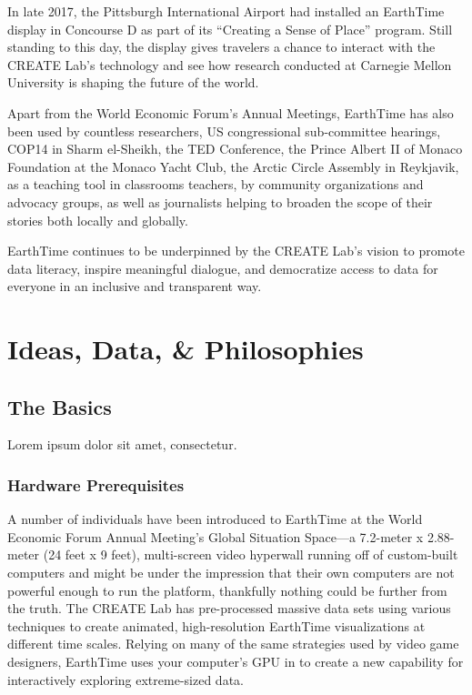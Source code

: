 \documentclass[
]{book}
\begin{document}
In late 2017, the Pittsburgh International Airport had installed an EarthTime display in Concourse D as part of its ``Creating a Sense of Place'' program. Still standing to this day, the display gives travelers a chance to interact with the CREATE Lab's technology and see how research conducted at Carnegie Mellon University is shaping the future of the world.

Apart from the World Economic Forum's Annual Meetings, EarthTime has also been used by countless researchers, US congressional sub-committee hearings, COP14 in Sharm el-Sheikh, the TED Conference, the Prince Albert II of Monaco Foundation at the Monaco Yacht Club, the Arctic Circle Assembly in Reykjavik, as a teaching tool in classrooms teachers, by community organizations and advocacy groups, as well as journalists helping to broaden the scope of their stories both locally and globally.

EarthTime continues to be underpinned by the CREATE Lab's vision to promote data literacy, inspire meaningful dialogue, and democratize access to data for everyone in an inclusive and transparent way.

\hypertarget{part-ideas-data-philosophies}{%
\part{Ideas, Data, \& Philosophies}\label{part-ideas-data-philosophies}}

\hypertarget{the-basics}{%
\chapter{The Basics}\label{the-basics}}

Lorem ipsum dolor sit amet, consectetur.

\hypertarget{hardware-prerequisites}{%
\section{Hardware Prerequisites}\label{hardware-prerequisites}}

A number of individuals have been introduced to EarthTime at the World Economic Forum Annual Meeting's Global Situation Space---a 7.2-meter x 2.88-meter (24 feet x 9 feet), multi-screen video hyperwall running off of custom-built computers and might be under the impression that their own computers are not powerful enough to run the platform, thankfully nothing could be further from the truth. The CREATE Lab has pre-processed massive data sets using various techniques to create animated, high-resolution EarthTime visualizations at different time scales. Relying on many of the same strategies used by video game designers, EarthTime uses your computer's GPU in to create a new capability for interactively exploring extreme-sized data.
\end{document}
